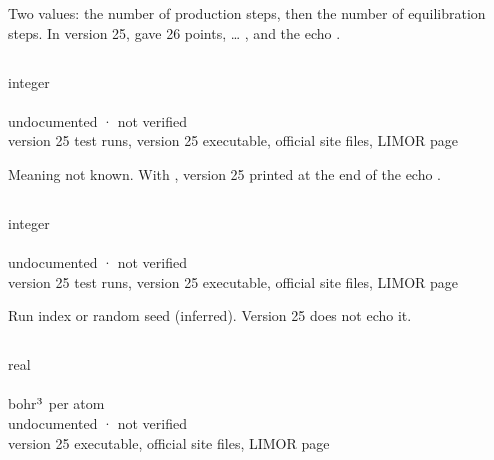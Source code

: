 \documentclass[letterpaper,10pt,english,openany,oneside]{sphinxmanual}
\begin{document}
\sphinxAtStartPar
Two values: the number of production steps, then the number of equilibration steps. In version 25, 
gave 26 points,  … , and the echo .


\subsection{}
\label{\detokenize{reference/dynamic:m}}\label{\detokenize{reference/dynamic:dynamic-m}}
\ignorespaces 
\sphinxAtStartPar
{} integer\\
 \\
 undocumented · not verified\\
 version 25 test runs, version 25 executable, official site files, LIMOR page

\sphinxAtStartPar
Meaning not known. With , version 25 printed  at the end of the echo .


\subsection{}
\label{\detokenize{reference/dynamic:i}}\label{\detokenize{reference/dynamic:dynamic-i}}
\ignorespaces 
\sphinxAtStartPar
{} integer\\
 \\
 undocumented · not verified\\
 version 25 test runs, version 25 executable, official site files, LIMOR page

\sphinxAtStartPar
Run index or random seed (inferred). Version 25 does not echo it.


\subsection{}
\label{\detokenize{reference/dynamic:v1}}\label{\detokenize{reference/dynamic:dynamic-v1}}
\ignorespaces 
\sphinxAtStartPar
{} real\\
 \\
 bohr\(\sp{\text{3}}\) per atom\\
 undocumented · not verified\\
 version 25 executable, official site files, LIMOR page
\end{document}
